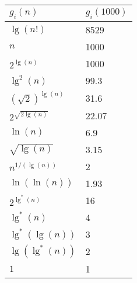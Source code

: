 \documentclass{article}
\begin{document}
\begin{enumerate}
\begin{enumerate}
\begin{minipage}{2in}
\end{minipage}
\begin{minipage}{2in}
 \centering
 \begin{tabular}{l l} 
    \toprule
    $g_{i}(n)$ & $g_{i}(1000)$ \\
    \toprule
    $\lg(n!)$ & 8529 \\ \hline
    $n$ & 1000 \\
    $2^{\lg(n)}$ & 1000 \\ \hline
    $\lg^{2}(n)$ & 99.3 \\ \hline
    $(\sqrt{2})^{\lg(n)}$ & 31.6 \\ \hline
    $2^{\sqrt{2\lg(n)}}$ & 22.07 \\ \hline
    $\ln(n)$ & 6.9 \\ \hline
    $\sqrt{\lg(n)}$ & 3.15 \\ \hline
    $n^{1/(\lg(n))}$ & 2 \\ \hline
    $\ln(\ln(n))$ & 1.93 \\ \hline
    $2^{\lg^{*}(n)}$ & 16 \\ \hline
    $\lg^{*}(n)$ & 4 \\ \hline
    $\lg^{*}(\lg(n))$ & 3 \\ \hline
    $\lg(\lg^{*}(n))$ & 2 \\ \hline
    $1$ & 1 \\
\end{tabular}
\end{minipage}


\end{enumerate}
\end{enumerate}
\end{document}
